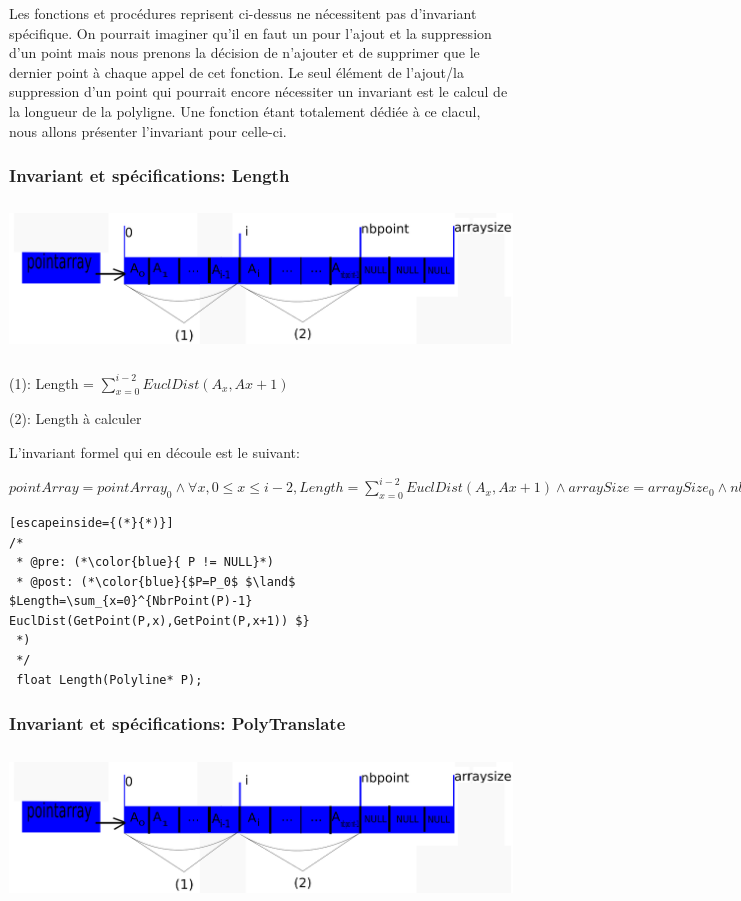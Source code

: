 \documentclass[a4paper, 11pt, oneside]{article}
\begin{document}
Les fonctions et procédures reprisent ci-dessus ne nécessitent pas d'invariant spécifique. On pourrait imaginer qu'il en faut un pour l'ajout et la suppression d'un point mais nous prenons la décision de n'ajouter et de supprimer que le dernier point à chaque appel de cet fonction. Le seul élément de l'ajout/la suppression d'un point qui pourrait encore nécessiter un invariant est le calcul de la longueur de la polyligne. Une fonction étant totalement dédiée à ce clacul, nous allons présenter l'invariant pour celle-ci. 

\subsubsection{Invariant et spécifications: Length}

\includegraphics[height=4cm, width=14cm]{inv1.png}

(1): Length = $\sum_{x=0}^{i-2} EuclDist(A_x,Ax+1)$

(2): Length à calculer

\noindent L'invariant formel qui en découle est le suivant:

\noindent$ pointArray = pointArray_0 \land \forall x, 0\leq x \leq i-2, Length =\sum_{x=0}^{i-2} EuclDist(A_x,Ax+1) \land arraySize = arraySize_0 \land nbpoint = nbpoint_0 $

\smallskip



\begin{lstlisting}[escapeinside={(*}{*)}]
/*
 * @pre: (*\color{blue}{ P != NULL}*)
 * @post: (*\color{blue}{$P=P_0$ $\land$ $Length=\sum_{x=0}^{NbrPoint(P)-1} EuclDist(GetPoint(P,x),GetPoint(P,x+1)) $}
 *)
 */
 float Length(Polyline* P);
\end{lstlisting}

\subsubsection{Invariant et spécifications: PolyTranslate}

\includegraphics[height=4cm, width=14cm]{inv1.png}
\end{document}
